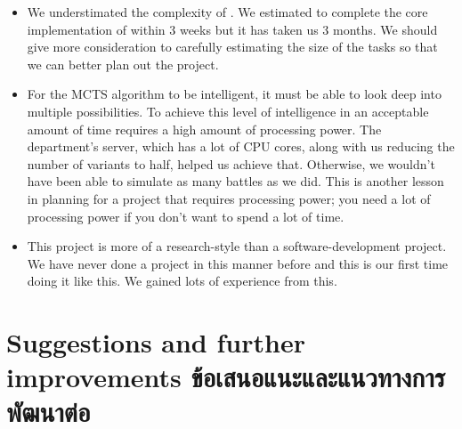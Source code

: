 \begin{itemize}
    \item We understimated the complexity of \RootB{}. We estimated to complete the core implementation of \RootOurs{} within 3 weeks but it has taken us 3 months. We should give more consideration to carefully estimating the size of the tasks so that we can better plan out the project.
    \item For the MCTS algorithm to be intelligent, it must be able to look deep into multiple possibilities. To achieve this level of intelligence in an acceptable amount of time requires a high amount of processing power. The department's server, which has a lot of CPU cores, along with us reducing the number of variants to half, helped us achieve that. Otherwise, we wouldn't have been able to simulate as many battles as we did. This is another lesson in planning for a project that requires processing power; you need a lot of processing power if you don't want to spend a lot of time.
    \item This project is more of a research-style than a software-development project. We have never done a project in this manner before and this is our first time doing it like this. We gained lots of experience from this.
\end{itemize}

\section{\ifenglish%
Suggestions and further improvements
\else%
ข้อเสนอแนะและแนวทางการพัฒนาต่อ
\fi
}

